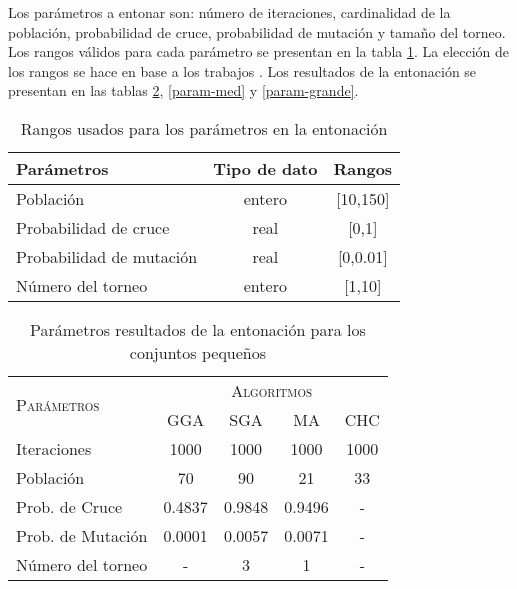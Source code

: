Los parámetros a entonar son: número de iteraciones, cardinalidad de la población, probabilidad de cruce, probabilidad de mutación y tamaño del torneo. Los rangos válidos para cada parámetro se presentan en la tabla \ref{rangos}. La elección de los rangos se hace en base a los trabajos \cite{de2004reduccion,de2004reduccion,garcia2012prototype,garcia2008memetic,talbi2009metaheuristics}. Los resultados de la entonación se presentan en las tablas \ref{param-peq}, \ref{param-med} y \ref{param-grande}.

\begin{table}[]
\centering
\begin{tabular}{l c c}
\hline
Parámetros & Tipo de dato & Rangos \\
\hline
\hline

Población                & entero           &  [10,150]       \\
Probabilidad de cruce    & real             &  [0,1]          \\
Probabilidad de mutación & real             &  [0,0.01]      \\
Número del torneo        & entero           &  [1,10]         \\  

\hline
\end{tabular}
\caption{Rangos usados para los parámetros en la entonación}
\label{rangos}
\end{table}

\begin{table}[]
\centering
\begin{tabular}{l c c c c}
\hline
\multirow{2}{*}{\textsc{Parámetros}}
	& \multicolumn{4}{c}{\textsc{Algoritmos}} \\
	& GGA & SGA & MA & CHC \\
\hline
\hline
Iteraciones             &  1000    &  1000    &  1000      &  1000 \\
Población               &    70    &    90    &    21      &    33 \\
Prob. de Cruce          &   0.4837 &   0.9848 &     0.9496 &     - \\
Prob. de Mutación       &   0.0001 &  0.0057  &     0.0071 &     - \\
Número del torneo       &   -      &    3     &     1      &     - \\
\hline
\end{tabular}
\caption{Parámetros resultados de la entonación para los conjuntos pequeños}
\label{param-peq}
\end{table}


